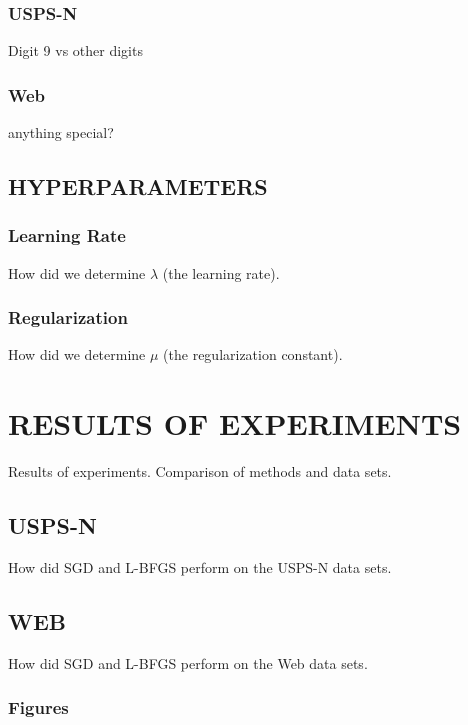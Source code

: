 \subsubsection{USPS-N}
Digit 9 vs other digits

\subsubsection{Web}
anything special?



\subsection{HYPERPARAMETERS}

\subsubsection{Learning Rate}
How did we determine $\lambda$ (the learning rate).

\subsubsection{Regularization}
How did we determine $\mu$ (the regularization constant).




\section{RESULTS OF EXPERIMENTS}
\label{sec:results}

Results of experiments. Comparison of methods and data sets.

\subsection{USPS-N}
How did SGD and L-BFGS perform on the USPS-N data sets.

\subsection{WEB}
How did SGD and L-BFGS perform on the Web data sets.


\subsubsection{Figures} 

